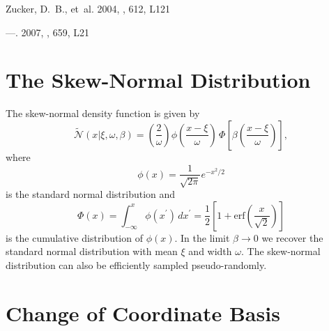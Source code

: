 \documentclass[preprint]{aastex}
\newcommand{\eqlabel}[1]{\label{eq:#1}}
\begin{document}
\begin{thebibliography}{}
{Zucker}, D.~B., {et~al.} 2004, \apjl, 612, L121

---. 2007, \apjl, 659, L21

\end{thebibliography}


\appendix

\section{The Skew-Normal Distribution}
\label{sect:sn}


The skew-normal density function is given by \citep{OHagan:1976a,Azzalini:1996}
\begin{equation}
    \eqlabel{sn}
    \tilde{\mathcal{N}} (x | \xi, \omega, \beta) = \left ( \frac{2}{\omega} \right ) \phi \left ( \frac{x-\xi}{\omega} \right ) \, \Phi \left [ \beta \left ( \frac{x-\xi}{\omega} \right ) \right ],
\end{equation}
where
\begin{equation}
    \phi (x) = \frac{1}{\sqrt{2\pi}} e^{-x^2/2}
\end{equation}
is the standard normal distribution and
\begin{equation}
    \Phi(x) = \int _{-\infty} ^x \phi(x^\prime) \, dx^\prime = \frac{1}{2} \left [ 1 + \mathrm{erf} \left ( \frac{x}{\sqrt{2}} \right )\right ]
\end{equation}
is the cumulative distribution of $\phi(x)$.  In the limit $\beta \rightarrow 0$ we recover the standard normal distribution with mean $\xi$ and width $\omega$.  The skew-normal distribution can also be efficiently sampled pseudo-randomly.



\section{Change of Coordinate Basis}
\end{document}
